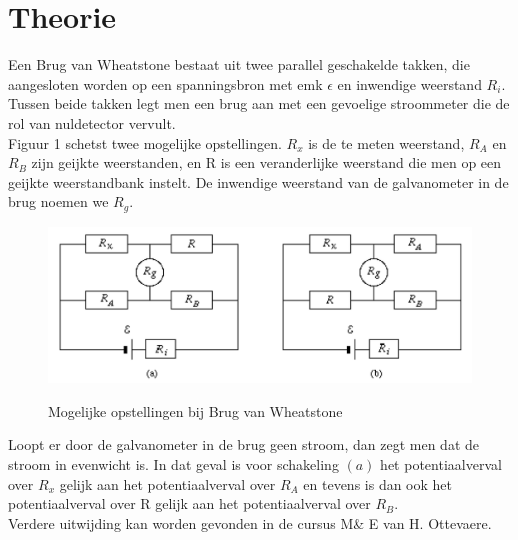 \section{Theorie}

Een Brug van Wheatstone bestaat uit twee parallel geschakelde takken,
die aangesloten worden op een spanningsbron met emk $\epsilon$ en inwendige 
weerstand $R_{i}$. Tussen beide takken legt men een brug aan met een gevoelige
stroommeter die de rol van nuldetector vervult. 
\\

Figuur 1 schetst twee mogelijke opstellingen.
$R_{x}$ is de te meten weerstand, $R_{A}$ en $R_{B}$ zijn geijkte weerstanden, en R is een 
veranderlijke weerstand die men op een geijkte weerstandbank instelt. De inwendige weerstand 
van de galvanometer in de brug noemen we $R_{g}$.
\\

\begin{figure}[H]
    \centering
    \caption{Mogelijke opstellingen bij Brug van Wheatstone}
    \includegraphics[width=\textwidth]{img/brug.png}
    \label{fig:grafiek}
\end{figure}

Loopt er door de galvanometer in de brug geen stroom, dan zegt men dat de stroom in evenwicht is.
In dat geval is voor schakeling $(a)$ het potentiaalverval over $R_{x}$ gelijk aan het potentiaalverval 
over $R_{A}$ en tevens is dan ook het potentiaalverval over R gelijk aan het potentiaalverval over $R_{B}$.
\\

Verdere uitwijding kan worden gevonden in de cursus M\& E
van H. Ottevaere\cite{cursusMnE}.